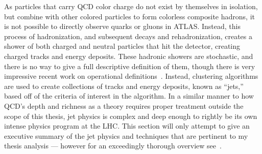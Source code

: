 As particles that carry \gls{QCD} color charge do not exist by themselves in isolation, but combine with other colored particles to form colorless composite hadrons, it is not possible to directly observe quarks or gluons in ATLAS.
Instead, this process of hadronization, and subsequent decays and rehadronization, creates a shower of both charged and neutral particles that hit the detector, creating charged tracks and energy deposits.
These hadronic showers are stochastic, and there is no way to give a full descriptive definition of them, though there is very impressive recent work on operational definitions~\cite{Metodiev:2018ftz,Komiske:2018vkc,Larkoski:2019nwj}.
Instead, clustering algorithms are used to create collections of tracks and energy deposits, known as ``jets,'' based off of the criteria of interest in the algorithm.
In a similar manner to how QCD's depth and richness as a theory requires proper treatment outside the scope of this thesis, jet physics is complex and deep enough to rightly be its own intense physics program at the LHC.
This section will only attempt to give an executive summary of the jet physics and techniques that are pertinent to my thesis analysis --- however for an exceedingly thorough overview see~\cite{Nachman:2016qyc}.

